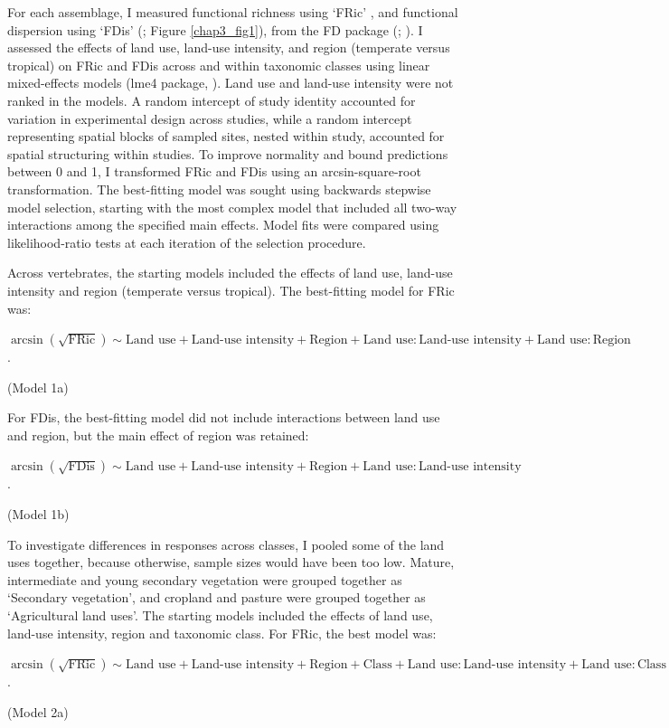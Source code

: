 For each assemblage, I measured functional richness using `FRic' \citep{Villeger2008}, and functional dispersion using `FDis’ (\citet{Laliberte2010}; Figure \ref{chap3_fig1}), from the FD package (\citet{Laliberte2010}; \citet{Laliberte2015}). I assessed the effects of land use, land-use intensity, and region (temperate versus tropical) on FRic and FDis across and within taxonomic classes using linear mixed-effects models (lme4 package, \citet{Bates2015}). Land use and land-use intensity were not ranked in the models. A random intercept of study identity accounted for variation in experimental design across studies, while a random intercept representing spatial blocks of sampled sites, nested within study, accounted for spatial structuring within studies. To improve normality and bound predictions between 0 and 1, I transformed FRic and FDis using an arcsin-square-root transformation. The best-fitting model was sought using backwards stepwise model selection, starting with the most complex model that included all two-way interactions among the specified main effects. Model fits were compared using likelihood-ratio tests at each iteration of the selection procedure.

Across vertebrates, the starting models included the effects of land use, land-use intensity and region (temperate versus tropical). The best-fitting model for FRic was:
\begin{center}
$\arcsin(\sqrt{\text{FRic}})\sim \text{Land use} + \text{Land-use intensity} + \text{Region} + \text{Land use}:\text{Land-use intensity} + \text{Land use}:\text{Region}$.\\
\end{center}
\hspace*{\fill}(Model 1a)

For FDis, the best-fitting model did not include interactions between land use and region, but the main effect of region was retained:
\begin{center}
$\arcsin(\sqrt{\text{FDis}})\sim \text{Land use} + \text{Land-use intensity} + \text{Region} + \text{Land use}:\text{Land-use intensity}$.\\
\end{center}
\hspace*{\fill}(Model 1b)

To investigate differences in responses across classes, I pooled some of the land uses together, because otherwise, sample sizes would have been too low. Mature, intermediate and young secondary vegetation were grouped together as `Secondary vegetation', and cropland and pasture were grouped together as `Agricultural land uses'. The starting models included the effects of land use, land-use intensity, region and taxonomic class. For FRic, the best model was:
\begin{center}
$\arcsin(\sqrt{\text{FRic}})\sim \text{Land use} + \text{Land-use  intensity} + \text{Region} + \text{Class} + \text{Land use}:\text{Land-use intensity} + \text{Land use}:\text{Class} + \text{Land-use intensity}:\text{Region} + \text{Class}:\text{Region}$.\\
\end{center}
\hspace*{\fill}(Model 2a)

